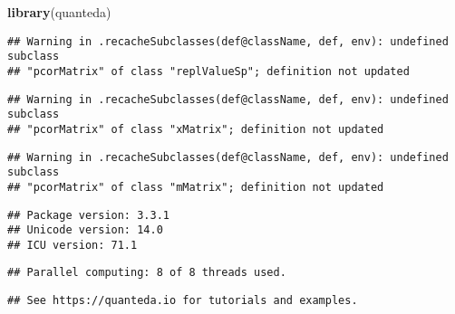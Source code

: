 \documentclass[
]{article}
\newenvironment{Shaded}{\begin{snugshade}}{\end{snugshade}}
\newcommand{\FunctionTok}[1]{\textcolor[rgb]{0.13,0.29,0.53}{\textbf{#1}}}
\newcommand{\NormalTok}[1]{#1}
\begin{document}
\begin{Shaded}
\begin{Highlighting}[]
\FunctionTok{library}\NormalTok{(quanteda)}
\end{Highlighting}
\end{Shaded}

\begin{verbatim}
## Warning in .recacheSubclasses(def@className, def, env): undefined subclass
## "pcorMatrix" of class "replValueSp"; definition not updated
\end{verbatim}

\begin{verbatim}
## Warning in .recacheSubclasses(def@className, def, env): undefined subclass
## "pcorMatrix" of class "xMatrix"; definition not updated
\end{verbatim}

\begin{verbatim}
## Warning in .recacheSubclasses(def@className, def, env): undefined subclass
## "pcorMatrix" of class "mMatrix"; definition not updated
\end{verbatim}

\begin{verbatim}
## Package version: 3.3.1
## Unicode version: 14.0
## ICU version: 71.1
\end{verbatim}

\begin{verbatim}
## Parallel computing: 8 of 8 threads used.
\end{verbatim}

\begin{verbatim}
## See https://quanteda.io for tutorials and examples.
\end{verbatim}
\end{document}
